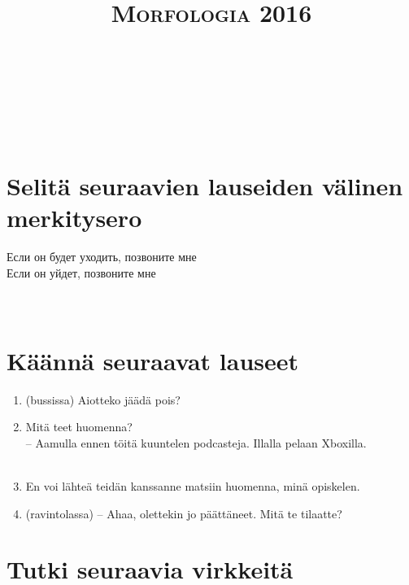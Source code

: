 \documentclass[paper=a4, fontsize=11pt]{scrartcl}
\title{	
\normalfont \normalsize 
\textsc{Morfologia 2016} \\ [25pt] 
\horrule{0.5pt} \\[0.4cm] 
\huge  \\ 
\horrule{2pt} \\[0.5cm] 
}
\date{}
\begin{document}
\onehalfspacing

\section{Selitä seuraavien lauseiden välinen merkitysero}\label{kuxe4uxe4nnuxe4-venuxe4juxe4ksi}

Если он будет уходить, позвоните мне \\
Если он уйдет, позвоните мне \\
\underline{\hspace{12cm}} \\
\underline{\hspace{12cm}} \\
\underline{\hspace{12cm}} 


\section{Käännä seuraavat lauseet}\label{kuxe4uxe4nnuxe4-venuxe4juxe4ksi}

\begin{enumerate}
\def\labelenumi{\arabic{enumi}.}
\item (bussissa) Aiotteko jäädä pois? \\
    \underline{\hspace{12cm}}
\item Mitä teet huomenna? \\
    -- Aamulla ennen töitä kuuntelen podcasteja. Illalla pelaan Xboxilla. \\
    \underline{\hspace{12cm}} \\
    \underline{\hspace{12cm}}
\item En voi lähteä teidän kanssanne matsiin huomenna, minä opiskelen. \\
    \underline{\hspace{12cm}}
\item (ravintolassa) -- Ahaa, olettekin jo päättäneet. Mitä te tilaatte?\\
    \underline{\hspace{12cm}}
\end{enumerate}


\section{Tutki seuraavia virkkeitä}
\end{document}

